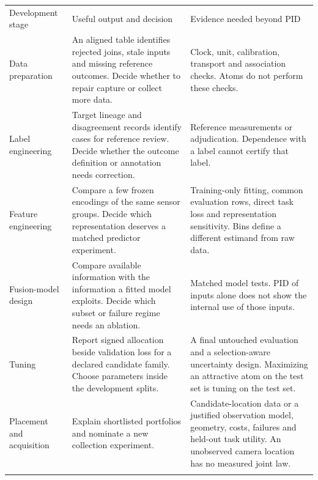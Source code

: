 \documentclass[11pt,a4paper]{article}
\newcounter{none}
\begin{document}
{\def\LTcaptype{none} %
\begin{longtable}[]{@{}
  >{\raggedright\arraybackslash}p{}
  >{\raggedright\arraybackslash}p{}
  >{\raggedright\arraybackslash}p{}@{}}
\toprule\noalign{}
\begin{minipage}[b]{\linewidth}\raggedright
Development stage
\end{minipage} & \begin{minipage}[b]{\linewidth}\raggedright
Useful output and decision
\end{minipage} & \begin{minipage}[b]{\linewidth}\raggedright
Evidence needed beyond PID
\end{minipage} \\*
\midrule\noalign{}
\endhead
\bottomrule\noalign{}
\endfoot
Data preparation & An aligned table identifies rejected joins, stale inputs and missing reference outcomes. Decide whether to repair capture or collect more data. & Clock, unit, calibration, transport and association checks. Atoms do not perform these checks. \\*
Label engineering & Target lineage and disagreement records identify cases for reference review. Decide whether the outcome definition or annotation needs correction. & Reference measurements or adjudication. Dependence with a label cannot certify that label. \\*
Feature engineering & Compare a few frozen encodings of the same sensor groups. Decide which representation deserves a matched predictor experiment. & Training-only fitting, common evaluation rows, direct task loss and representation sensitivity. Bins define a different estimand from raw data. \\*
Fusion-model design & Compare available information with the information a fitted model exploits. Decide which subset or failure regime needs an ablation. & Matched model tests. PID of inputs alone does not show the internal use of those inputs. \\*
Tuning & Report signed allocation beside validation loss for a declared candidate family. Choose parameters inside the development splits. & A final untouched evaluation and a selection-aware uncertainty design. Maximizing an attractive atom on the test set is tuning on the test set. \\*
Placement and acquisition & Explain shortlisted portfolios and nominate a new collection experiment. & Candidate-location data or a justified observation model, geometry, costs, failures and held-out task utility. An unobserved camera location has no measured joint law. \\*

\end{longtable}}
\end{document}
